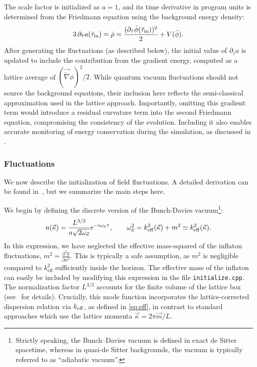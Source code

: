 \documentclass[aps, nofootinbib,superscriptaddress, preprintnumbers, longbibliography]{article}
\begin{document}
The scale factor is initialized as $a = 1$, and its time derivative in program units is determined from the Friedmann equation using the background energy density:
\begin{equation}
\label{eq:initial_H}
3\,\partial_{\tilde\tau} a(\tilde\tau_{\rm in}) = \bar\rho = \frac{(\partial_{\tilde\tau} \bar\phi(\tilde\tau_{\rm in}))^2}{2} + V(\bar\phi).
\end{equation}
After generating the fluctuations (as described below), the initial value of $\partial_{\tilde\tau} a$ is updated to include the contribution from the gradient energy, computed as a lattice average of $(\vec{\tilde\nabla} \phi)^2 / 2$. While quantum vacuum fluctuations should not source the background equations, their inclusion here reflects the semi-classical approximation used in the lattice approach. Importantly, omitting this gradient term would introduce a residual curvature term into the second Friedmann equation, compromising the consistency of the evolution. Including it also enables accurate monitoring of energy conservation during the simulation, as discussed in \cite{latticeeasy,Caravano:2022yyv}.

\subsubsection{Fluctuations}

We now describe the initialization of field fluctuations. A detailed derivation can be found in~\cite{Caravano:2022yyv}, but we summarize the main steps here.

We begin by defining the discrete version of the Bunch-Davies vacuum\footnote{Strictly speaking, the Bunch–Davies vacuum is defined in exact de Sitter spacetime, whereas in quasi-de Sitter backgrounds, the vacuum is typically referred to as ``adiabatic vacuum''.}:
\begin{equation}
\label{eq:discBD}
u(\vec\kappa) = \frac{L^{3/2}}{a \sqrt{2 \omega_{\vec\kappa}}} e^{-i \omega_{\vec\kappa} \tau}, \quad\quad \omega_{\vec\kappa}^2 = k_{\rm eff}^2(\vec\kappa) + m^2 \simeq k_{\rm eff}^2(\vec\kappa).
\end{equation}
In this expression, we have neglected the effective mass-squared of the inflaton fluctuations, $m^2 = \frac{\partial^2 V}{\partial\phi^2}$. This is typically a safe assumption, as $m^2$ is negligible compared to $k_{\text{eff}}^2$ sufficiently inside the horizon. The effective mass of the inflaton can easily be included by modifying this expression in the file \texttt{initialize.cpp}. The normalization factor $L^{3/2}$ accounts for the finite volume of the lattice box (see~\cite{Caravano:2022yyv} for details). Crucially, this mode function incorporates the lattice-corrected dispersion relation via $k_{\rm eff}$, as defined in \cref{eq:eff}, in contrast to standard approaches which use the lattice momenta $\vec{\kappa} = 2\pi \vec{m} / L$.
\end{document}
